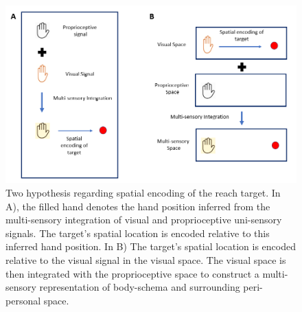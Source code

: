\begin{figure}[t]
\centering       
    \includegraphics[width=\textwidth, keepaspectratio]{Images/ms_mechanisms.png}
    \caption{Two hypothesis regarding spatial encoding of the reach target. In A), the filled hand denotes the hand position inferred from the multi-sensory integration of visual and proprioceptive uni-sensory signals. The target's spatial location is encoded relative to this inferred hand position. In B) The target's spatial location is encoded relative to the visual signal in the visual space. The visual space is then integrated with the proprioceptive space to construct a multi-sensory representation of body-schema and surrounding peri-personal space.}
    \label{fig:ms-mechanisms}
\end{figure}